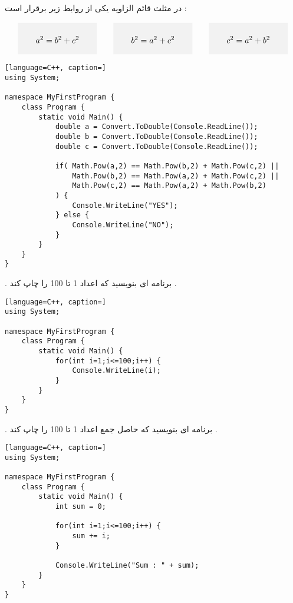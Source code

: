 \documentclass[12pt]{article}
\begin{document}
در مثلث قائم الزاویه یکی از روابط زیر برقرار است :


\begin{align*}
\colorbox{gray!10}{\parbox{90pt}{
$$a^{2} = b^{2} + c^{2}$$
}}
\qquad
\colorbox{gray!10}{\parbox{90pt}{
$$b^{2} = a^{2} + c^{2}$$
}}
\qquad
\colorbox{gray!10}{\parbox{90pt}{
$$c^{2} = a^{2} + b^{2} $$
}}
\end{align*}





\begin{latin}
\begin{lstlisting}[language=C++, caption=]
using System;

namespace MyFirstProgram {
	class Program {
		static void Main() {
			double a = Convert.ToDouble(Console.ReadLine());
			double b = Convert.ToDouble(Console.ReadLine());
			double c = Convert.ToDouble(Console.ReadLine());

			if( Math.Pow(a,2) == Math.Pow(b,2) + Math.Pow(c,2) || 
				Math.Pow(b,2) == Math.Pow(a,2) + Math.Pow(c,2) ||
				Math.Pow(c,2) == Math.Pow(a,2) + Math.Pow(b,2) 
			) {
				Console.WriteLine("YES");
			} else {
				Console.WriteLine("NO");
			}
		}
	}
}
\end{lstlisting}
\end{latin}






\newpage

 . برنامه ای بنویسید که اعداد 1 تا 100 را چاپ کند .



\begin{latin}
\begin{lstlisting}[language=C++, caption=]
using System;

namespace MyFirstProgram {
	class Program {
		static void Main() {
			for(int i=1;i<=100;i++) {
				Console.WriteLine(i);
			}
		}
	}
}
\end{lstlisting}
\end{latin}







 . برنامه ای بنویسید که حاصل جمع اعداد 1 تا 100 را چاپ کند .





\begin{latin}
\begin{lstlisting}[language=C++, caption=]
using System;

namespace MyFirstProgram {
	class Program {
		static void Main() {
			int sum = 0;
			
			for(int i=1;i<=100;i++) {
				sum += i;
			}
			
			Console.WriteLine("Sum : " + sum);
		}
	}
}
\end{lstlisting}
\end{latin}
\end{document}
